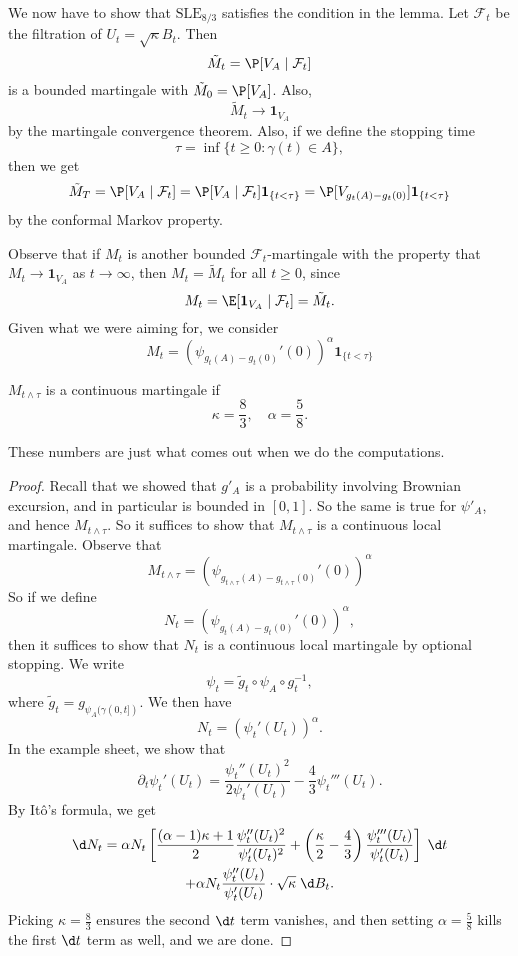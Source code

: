 \documentclass[a4paper]{article}
\newcommand\SLE{\mathrm{SLE}}
\begin{document}
We now have to show that $\SLE_{8/3}$ satisfies the condition in the lemma. Let $\mathcal{F}_t$ be the filtration of $U_t = \sqrt{\kappa} B_t$. Then
\[
  \tilde{M}_t = \P[V_A \mid \mathcal{F}_t]
\]
is a bounded martingale with $\tilde{M}_0 = \P[V_A]$. Also,
\[
  \tilde{M}_t \to \mathbf{1}_{V_A}
\]
by the martingale convergence theorem. Also, if we define the stopping time
\[
  \tau = \inf \{t \geq 0: \gamma(t) \in A\},
\]
then we get
\[
  \tilde{M}_T = \P[V_A \mid \mathcal{F}_t] = \P[V_A \mid \mathcal{F}_t] \mathbf{1}_{\{t < \tau\}} = \P[V_{g_t(A) - g_t(0)}] \mathbf{1}_{\{t < \tau\}}
\]
by the conformal Markov property.

Observe that if $M_t$ is another bounded $\mathcal{F}_t$-martingale with the property that $M_t \to \mathbf{1}_{V_A}$ as $t \to \infty$, then $M_t = \tilde{M}_t$ for all $t \geq 0$, since
\[
  M_t = \E[\mathbf{1}_{V_A} \mid \mathcal{F}_t] = \tilde{M}_t.
\]
Given what we were aiming for, we consider
\[
  M_t = (\psi_{g_t(A) - g_t(0)}'(0))^\alpha \mathbf{1}_{\{t < \tau\}}
\]
\begin{lemma}
  $M_{t \wedge \tau}$ is a continuous martingale if
  \[
    \kappa = \frac{8}{3},\quad \alpha = \frac{5}{8}.
  \]
\end{lemma}
These numbers are just what comes out when we do the computations.

\begin{proof}
  Recall that we showed that $g'_A$ is a probability involving Brownian excursion, and in particular is bounded in $[0, 1]$. So the same is true for $\psi'_A$, and hence $M_{t \wedge \tau}$. So it suffices to show that $M_{t \wedge \tau}$ is a continuous local martingale. Observe that
  \[
    M_{t \wedge \tau} = (\psi_{g_{t \wedge \tau}(A) - g_{t \wedge \tau}(0)}'(0))^\alpha
  \]
  So if we define
  \[
    N_t = (\psi_{g_t(A) - g_t(0)}'(0))^\alpha,
  \]
  then it suffices to show that $N_t$ is a continuous local martingale by optional stopping. We write
  \[
    \psi_t = \tilde{g}_t \circ \psi_A \circ g_t^{-1},
  \]
  where $\tilde{g}_t = g_{\psi_A(\gamma(0, t])}$. We then have
  \[
    N_t = (\psi_t'(U_t))^\alpha.
  \]
  In the example sheet, we show that
  \[
    \partial_t \psi_t' (U_t) = \frac{\psi_t''(U_t)^2}{2\psi_t'(U_t)} - \frac{4}{3} \psi_t'''(U_t).
  \]
  By It\^o's formula, we get
  \begin{multline*}
    \d N_t = \alpha N_t \left[\frac{(\alpha - 1)\kappa + 1}{2} \frac{\psi_t''(U_t)^2}{\psi_t'(U_t)^2} + \left(\frac{\kappa}{2} - \frac{4}{3}\right) \frac{\psi_t'''(U_t)}{\psi_t'(U_t)}\right]\;\d t \\
    + \alpha N_t \frac{\psi_t''(U_t)}{\psi_t'(U_t)} \cdot \sqrt{\kappa} \;\d B_t.
  \end{multline*}
  Picking $\kappa = \frac{8}{3}$ ensures the second $\d t$ term vanishes, and then setting $\alpha = \frac{5}{8}$ kills the first $\d t$ term as well, and we are done.
\end{proof}
\end{document}
